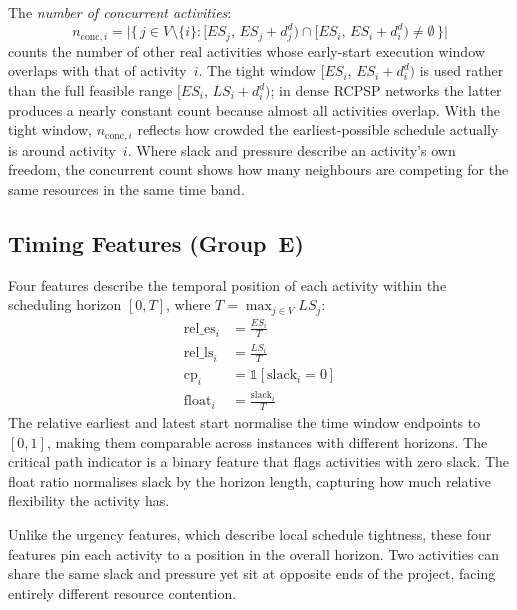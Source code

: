 The \textit{number of concurrent activities}:
\begin{equation}
    n_{\mathrm{conc},i} = \bigl|\bigl\{\, j \in V \setminus \{i\}
    : [ES_j,\, ES_j + d_j^d) \cap [ES_i,\, ES_i + d_i^d) \neq
    \emptyset \,\bigr\}\bigr|
    \label{eq:n_concurrent}
\end{equation}
counts the number of other real activities whose early-start
execution window overlaps with that of activity~$i$. The tight window $[ES_i,\, ES_i + d_i^d)$ is used rather
than the full feasible range $[ES_i,\, LS_i + d_i^d)$; in dense
RCPSP networks the latter produces a nearly constant count
because almost all activities overlap. With the tight window,
$n_{\mathrm{conc},i}$ reflects how crowded the earliest-possible
schedule actually is around activity~$i$. Where slack and
pressure describe an activity's own freedom, the concurrent count
shows how many neighbours are competing for the same resources in
the same time band.

\subsection{Timing Features (Group~E)}
\label{subsec:timing_features}

Four features describe the temporal position of each activity
within the scheduling horizon $[0, T]$, where
$T = \max_{j \in V} LS_j$:
\begin{align}
    \mathrm{rel\_es}_i   &= \frac{ES_i}{T}
    \label{eq:rel_es} \\[4pt]
    \mathrm{rel\_ls}_i   &= \frac{LS_i}{T}
    \label{eq:rel_ls} \\[4pt]
    \mathrm{cp}_i        &= \mathbb{1}[\mathrm{slack}_i = 0]
    \label{eq:critical_path} \\[4pt]
    \mathrm{float}_i     &= \frac{\mathrm{slack}_i}{T}
    \label{eq:float_ratio}
\end{align}
The relative earliest and latest start normalise the time
window endpoints to $[0,1]$, making them comparable across
instances with different horizons. The critical path indicator
is a binary feature that flags activities with zero slack.
The float ratio normalises slack by the horizon length,
capturing how much relative flexibility the activity has.

Unlike the urgency features, which describe local schedule
tightness, these four features pin each activity to a position
in the overall horizon. Two activities can share the same slack
and pressure yet sit at opposite ends of the project, facing
entirely different resource contention.

